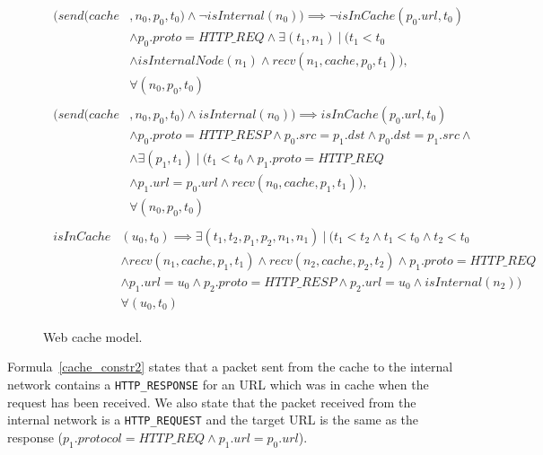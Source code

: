 \begin{figure}[h]
	{\footnotesize
		\begin{subequations}
			\begin{align}
			\begin{split}
			\label{cache_constr1}
			(send(cache&, n_{0}, p_{0}, t_{0}) \wedge \neg isInternal(n_{0})) \implies \neg isInCache(p_{0}.url, t_{0}) \\
			& \wedge p_{0}.proto = HTTP\_REQ \wedge \exists (t_{1}, n_{1}) \: | \: (t_{1} < t_{0} \\
			& \wedge isInternalNode(n_{1}) \wedge recv(n_{1}, cache, p_{0}, t_{1})), \\
			& \forall (n_{0}, p_{0}, t_{0})
			\end{split} \\
			\begin{split}
			\label{cache_constr2}
			(send(cache&, n_{0}, p_{0}, t_{0}) \wedge isInternal(n_{0})) \implies isInCache(p_{0}.url, t_{0}) \\
			& \wedge p_{0}.proto = HTTP\_RESP \wedge p_{0}.src = p_{1}.dst \wedge p_{0}.dst = p_{1}.src \wedge \\
			& \wedge \exists  (p_{1}, t_{1}) \: | \: (t_{1} < t_{0} \wedge p_{1}.proto = HTTP\_REQ  \\
			& \wedge p_{1}.url = p_{0}.url \wedge recv(n_{0}, cache, p_{1}, t_{1})), \\
			& \forall (n_{0}, p_{0}, t_{0})
			\end{split} \\
			\begin{split}
			\label{cache_constr3}
			isInCache&(u_{0}, t_{0}) \implies \exists (t_{1}, t_{2}, p_{1}, p_{2}, n_{1}, n_{1}) \: | \: (t_{1} < t_{2} \wedge t_{1} < t_{0} \wedge t_{2} < t_{0} \\
			& \wedge recv(n_{1}, cache, p_{1}, t_{1}) \wedge recv(n_{2}, cache, p_{2}, t_{2}) \wedge p_{1}.proto = HTTP\_REQ \\
			& \wedge p_{1}.url = u_{0} \wedge p_{2}.proto = HTTP\_RESP \wedge p_{2}.url = u_{0} \wedge isInternal(n_{2})) \\
			& \forall (u_{0}, t_{0})
			\end{split}
			\end{align}
			\end{subequations}
			}%
			\caption{Web cache model.}
			\label{cache_model}
\end{figure}

Formula~\ref{cache_constr2} states that a packet sent from the cache to the internal network contains a \texttt{HTTP\_RESPONSE} for an URL which was in cache when the request has been received. We also state that the packet received from the internal network is a \texttt{HTTP\_REQUEST} and the target URL is the same as the response (\textit{$p_{1}.protocol = HTTP\_REQ \wedge p_{1}.url = p_{0}.url$}). 

